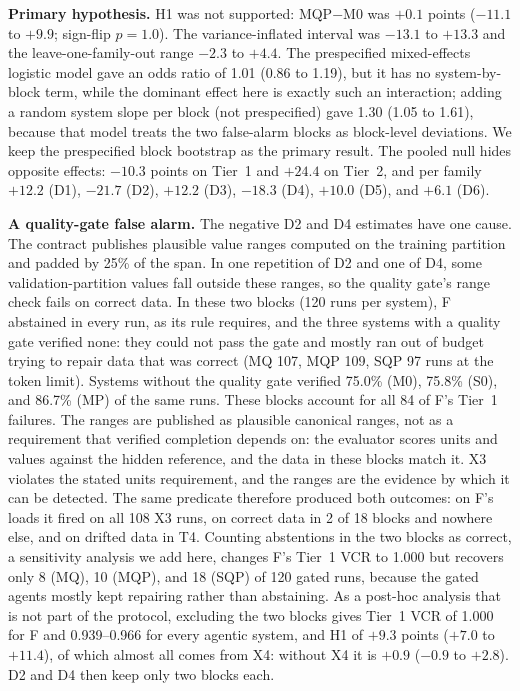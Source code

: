 \documentclass[conference]{IEEEtran}
\newcommand{\sys}[1]{\textsf{#1}}
\begin{document}
\textbf{Primary hypothesis.} H1 was not supported: \sys{MQP}$-$\sys{M0} was $+0.1$ points ($-11.1$ to $+9.9$; sign-flip
$p=1.0$). The variance-inflated interval was $-13.1$ to $+13.3$ and the leave-one-family-out range $-2.3$ to $+4.4$.
The prespecified mixed-effects logistic model gave an odds ratio of 1.01 (0.86 to 1.19), but it has no
system-by-block term, while the dominant effect here is exactly such an interaction; adding a random system slope per
block (not prespecified) gave 1.30 (1.05 to 1.61), because that model treats the two false-alarm blocks as
block-level deviations. We keep the prespecified block bootstrap as the primary result. The pooled null hides opposite effects: $-10.3$ points on Tier~1 and $+24.4$ on Tier~2, and per family
$+12.2$ (D1), $-21.7$ (D2), $+12.2$ (D3), $-18.3$ (D4), $+10.0$ (D5), and $+6.1$ (D6).

\textbf{A quality-gate false alarm.} The negative D2 and D4 estimates have one cause. The contract publishes
plausible value ranges computed on the training partition and padded by 25\% of the span. In one repetition of D2
and one of D4, some validation-partition values fall outside these ranges, so the quality gate's range check fails on
correct data. In these two blocks (120 runs per system), \sys{F} abstained in every run, as its rule requires, and the
three systems with a quality gate verified none: they could not pass the gate and mostly ran out of budget trying to
repair data that was correct (\sys{MQ} 107, \sys{MQP} 109, \sys{SQP} 97 runs at the token limit). Systems without
the quality gate verified 75.0\% (\sys{M0}), 75.8\% (\sys{S0}), and 86.7\% (\sys{MP}) of the same runs. These blocks
account for all 84 of \sys{F}'s Tier~1 failures. The ranges are published as plausible canonical ranges, not as a
requirement that verified completion depends on: the evaluator scores units and values against the hidden reference,
and the data in these blocks match it. X3 violates the stated units requirement, and the ranges are the evidence by
which it can be detected. The same predicate therefore produced both outcomes: on \sys{F}'s loads it fired on all 108
X3 runs, on correct data in 2 of 18 blocks and nowhere else, and on drifted data in T4. Counting abstentions in the two
blocks as correct, a sensitivity analysis we add here, changes \sys{F}'s Tier~1 VCR to 1.000 but recovers only 8
(\sys{MQ}), 10 (\sys{MQP}), and 18 (\sys{SQP}) of 120 gated runs, because the gated agents mostly kept repairing
rather than abstaining. As a post-hoc analysis that is not part of the protocol, excluding
the two blocks gives Tier~1 VCR of 1.000 for \sys{F} and 0.939--0.966 for every agentic system, and H1 of $+9.3$
points ($+7.0$ to $+11.4$), of which almost all comes from X4: without X4 it is $+0.9$ ($-0.9$ to $+2.8$). D2 and D4
then keep only two blocks each.
\end{document}
